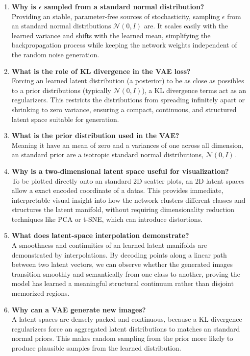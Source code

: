 \documentclass[10pt]{article}
\begin{document}
\begin{enumerate}
\item \textbf{Why is $\epsilon$ sampled from a standard normal distribution?}\\
Providing an stable, parameter-free sources of stochasticity, sampling $\epsilon$ from an standard normal distributions $\mathcal{N}(0, I)$ are. It scales easily with the learned variance and shifts with the learned mean, simplifying the backpropagation process while keeping the network weights independent of the random noise generation.

\item \textbf{What is the role of KL divergence in the VAE loss?}\\
Forcing an learned latent distribution (a posterior) to be as close as possibles to a prior distributions (typically $\mathcal{N}(0, I)$), a KL divergence terms act as an regularizers. This restricts the distributions from spreading infinitely apart or shrinking to zero variance, ensuring a compact, continuous, and structured latent space suitable for generation.

\item \textbf{What is the prior distribution used in the VAE?}\\
Meaning it have an mean of zero and a variances of one across all dimension, an standard prior are a isotropic standard normal distributions, $\mathcal{N}(0, I)$.

\item \textbf{Why is a two-dimensional latent space useful for visualization?}\\
To be plotted directly onto an standard 2D scatter plots, an 2D latent spaces allow a exact encoded coordinate of a datas. This provides immediate, interpretable visual insight into how the network clusters different classes and structures the latent manifold, without requiring dimensionality reduction techniques like PCA or t-SNE, which can introduce distortions.

\item \textbf{What does latent-space interpolation demonstrate?}\\
A smoothness and continuities of an learned latent manifolds are demonstrated by interpolations. By decoding points along a linear path between two latent vectors, we can observe whether the generated images transition smoothly and semantically from one class to another, proving the model has learned a meaningful structural continuum rather than disjoint memorized regions.

\item \textbf{Why can a VAE generate new images?}\\
A latent spaces are densely packed and continuous, because a KL divergence regularizers force an aggregated latent distributions to matches an standard normal priors. This makes random sampling from the prior more likely to produce plausible samples from the learned distribution.


\end{enumerate}
\end{document}
